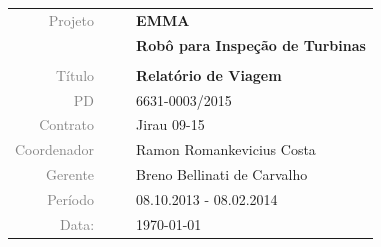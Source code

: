 \vspace{4cm}

\begin{table}[ht!]
	\centering
	\begin{tabular}{r l|l p{12cm} }
		\textcolor{gray}{Projeto} &&& \textbf{\Large EMMA}\\
			&&& \textbf{Robô para Inspeção de Turbinas}\\
			&&& \\
		\textcolor{gray}{Título} &&& \textbf{Relatório de Viagem}\\
		\textcolor{gray}{PD} &&& 6631-0003/2015 \\
		\textcolor{gray}{Contrato} &&& Jirau 09-15\\
		\textcolor{gray}{Coordenador} &&& Ramon Romankevicius Costa \\
		\textcolor{gray}{Gerente} &&& Breno Bellinati de Carvalho \\
		\textcolor{gray}{Período} &&& 08.10.2013 - 08.02.2014 \\
		\textcolor{gray}{Data:} &&& \today \\
	\end{tabular}
\end{table}


\cleardoublepage

